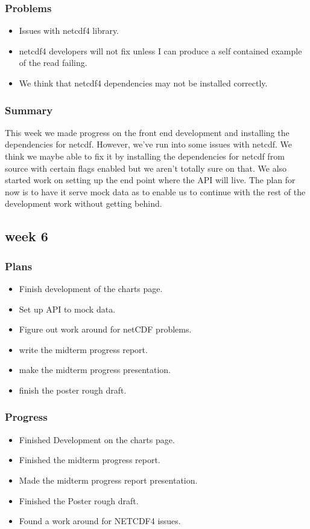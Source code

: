 \documentclass[onecolumn, draftclsnofoot,10pt, compsoc]{article}
\begin{document}
			\subsubsection{Problems}
				\begin{itemize}
					\item Issues with netcdf4 library.
					\item netcdf4 developers will not fix unless I can produce a self contained example of the read failing.
					\item We think that netcdf4 dependencies may not be installed correctly.
				\end{itemize}
				
			\subsubsection{Summary}
			 This week we made progress on the front end development and installing the dependencies for netcdf. However, we've run into some issues with netcdf. We think we maybe able to fix it by installing the dependencies for netcdf from source with certain flags enabled but we aren't totally sure on that. We also started work on setting up the end point where the API will live. The plan for now is to have it serve mock data as to enable us to continue with the rest of the development work without getting behind.\\
			
		\subsection{week 6}
			\subsubsection{Plans}
				\begin{itemize}
					\item Finish development of the charts page.
					\item Set up API to mock data.
					\item Figure out work around for netCDF problems.
					\item write the midterm progress report.
					\item make the midterm progress presentation.
					\item finish the poster rough draft.
				\end{itemize}
			\subsubsection{Progress}
				\begin{itemize}
					\item Finished Development on the charts page.
					\item Finished the midterm progress report.
					\item Made the midterm progress report presentation.
					\item Finished the Poster rough draft.
					\item Found a work around for NETCDF4 issues.
				\end{itemize}
\end{document}
